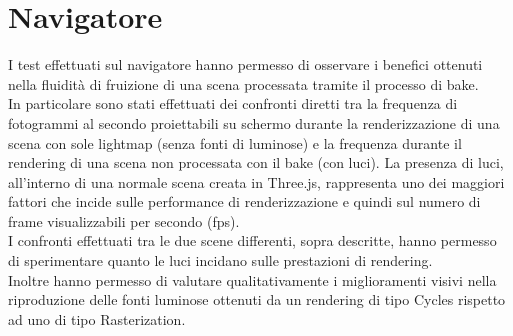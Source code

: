 \section{Navigatore}
\label{sec:chapter_prove_sperimentali_navigator}

I test effettuati sul navigatore hanno permesso di osservare i benefici ottenuti nella fluidità di fruizione di una scena processata tramite il processo di  bake.
\\
In particolare sono stati effettuati dei confronti diretti tra la frequenza di fotogrammi al secondo proiettabili su schermo durante la renderizzazione di una scena con sole lightmap (senza fonti di luminose) e la frequenza durante il rendering di una scena non processata con il bake (con luci).
La presenza di luci, all’interno di una normale scena creata in Three.js, rappresenta uno dei maggiori fattori che incide sulle performance di renderizzazione e quindi sul numero di frame visualizzabili per secondo (fps).
\\
I confronti effettuati tra le due scene differenti, sopra descritte, hanno permesso di sperimentare quanto le luci incidano sulle prestazioni di rendering.
\\ 
Inoltre hanno permesso di valutare qualitativamente i miglioramenti visivi nella riproduzione delle fonti luminose ottenuti da un rendering di tipo Cycles rispetto ad uno di tipo Rasterization.

